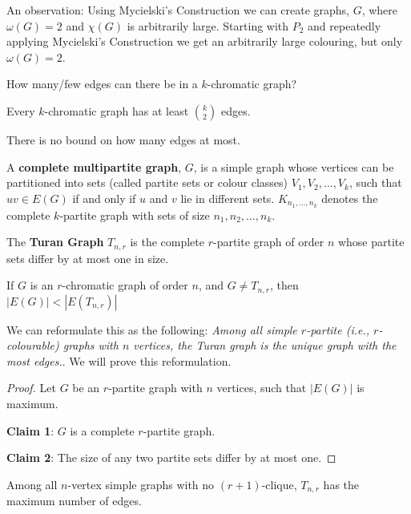 An observation: Using Mycielski's Construction we can create graphs, $G$, where $\omega(G) = 2$ and $\chi(G)$ is arbitrarily large. Starting with $P_{2}$ and repeatedly applying Mycielski's Construction we get an arbitrarily large colouring, but only \(\omega(G) = 2\).

How many/few edges can there be in a $k$-chromatic graph?

\begin{proposition}
	Every $k$-chromatic graph has at least $\binom{k}{2}$ edges.
\end{proposition}

There is no bound on how many edges at most.

\begin{definition}
	A \textbf{complete multipartite graph}, $G$, is a simple graph whose vertices can be partitioned into sets (called partite sets or colour classes) $V_{1}, V_{2}, \ldots, V_{k}$, such that $uv \in E(G)$ if and only if $u$ and $v$ lie in different sets. $K_{n_{1}, \ldots, n_{k}}$ denotes the complete $k$-partite graph with sets of size $n_{1}, n_{2}, \ldots, n_{k}$.
\end{definition}

The \textbf{Turan Graph} $T_{n,r}$ is the complete $r$-partite graph of order $n$ whose partite sets differ by at most one in size.

\begin{lemma}
	\label{5.2.8}
	If $G$ is an $r$-chromatic graph of order $n$, and $G \ne T_{n,r}$, then $|E(G)| < |E(T_{n,r})|$
\end{lemma}

We can reformulate this as the following: \textit{Among all simple $r$-partite (i.e., $r$-colourable) graphs with $n$ vertices, the Turan graph is the unique graph with the most edges.}. We will prove this reformulation.

\begin{proof}
	Let $G$ be an $r$-partite graph with $n$ vertices, such that $|E(G)|$ is maximum.

	\textbf{Claim 1}: $G$ is a complete $r$-partite graph.

	\textbf{Claim 2}: The size of any two partite sets differ by at most one.
\end{proof}

\begin{theorem}[Turan, 1941]
	Among all $n$-vertex simple graphs with no $(r+1)$-clique, $T_{n,r}$ has the maximum number of edges.
\end{theorem}


